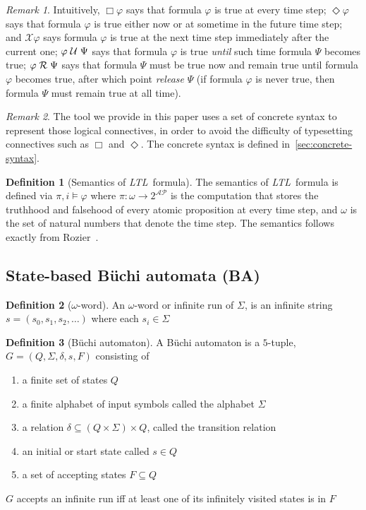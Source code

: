 \documentclass[conference]{IEEEtran}
\theoremstyle{definition}
\newtheorem{definition}{Definition}[section]
\theoremstyle{remark}
\newtheorem{remark}{Remark}[section]
\newcommand{\AP}{\mathcal{AP}}
\newcommand{\always}{\Box}
\newcommand{\eventually}{\Diamond}
\newcommand{\nextt}{\mathcal{X}}
\newcommand{\ltl}{\textit{LTL}}
\newcommand{\Buchi}{B\"{u}chi }
\newcommand{\stronguntil}{\hspace{0.1cm} \mathcal{U}  \hspace{0.1cm}}
\newcommand{\weakrelease}{\hspace{0.1cm} \mathcal{R} \hspace{0.1cm}}
\begin{document}
\begin{remark}
    Intuitively, $\always \varphi$ says that formula $\varphi$ is true at every time step; $\eventually \varphi$ says that formula $\varphi$ is true either now or at sometime in the future time step; and $\nextt \varphi$ says formula $\varphi$ is true at the next time step immediately after the current one; $\varphi \stronguntil \Psi$ says that formula $\varphi$ is true \textit{until} such time formula $\Psi$ becomes true; $\varphi \weakrelease \Psi$ says that formula $\Psi$ must be true now and remain true until formula $\varphi$ becomes true, after which point \textit{release} $\Psi$ (if formula $\varphi$ is never true, then formula $\Psi$ must remain true at all time).
\end{remark}

\begin{remark}
    The tool we provide in this paper uses a set of concrete syntax to represent those logical connectives, in order to avoid the difficulty of typesetting connectives such as $\always$ and $\eventually$. The concrete syntax is defined in~\ref{sec:concrete-syntax}.
\end{remark}

\begin{definition}[Semantics of \ltl\ formula]
    The semantics of \ltl\ formula is defined via  $\pi, i \models \varphi$ where $\pi : \omega \rightarrow 2^{\AP}$ is the computation that stores the truthhood and falsehood of every atomic proposition at every time step, and $\omega$ is the set of natural numbers that denote the time step. The semantics follows exactly from Rozier~\cite{Roz11}.
\end{definition}

\subsection{State-based \Buchi automata (BA)}
\begin{definition}[$\omega$-word]
    An $\omega$-word or infinite run of $\Sigma$, is an infinite string $s = (s_0, s_1, s_2, \dots)$ where each $s_i\in \Sigma$
\end{definition}
\begin{definition}[\Buchi automaton]
    A \Buchi automaton is a $5$-tuple, $G = (Q, \Sigma, \delta, s, F)$ consisting of
    \begin{enumerate}
        \item a finite set of states $Q$
        \item a finite alphabet of input symbols called the alphabet $\Sigma$
        \item a relation $\delta \subseteq (Q\times \Sigma) \times Q$, called the transition relation
        \item an initial or start state called $s\in Q$
        \item a set of accepting states $F \subseteq Q$
    \end{enumerate}
    $G$ accepts an infinite run iff at least one of its infinitely visited states is in $F$
\end{definition}
\end{document}
